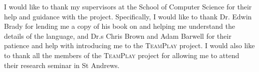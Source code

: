 I would like to thank my supervisors at the School of Computer Science for their help and guidance with the project. Specifically, I would like to thank Dr. Edwin Brady for lending me a copy of his book on \Idris and helping me understand the details of the language, and Dr.s Chris Brown and Adam Barwell for their patience and help with introducing me to the \textsc{TeamPlay} project. I would also like to thank all the members of the \textsc{TeamPlay} project for allowing me to attend their research seminar in St Andrews.
